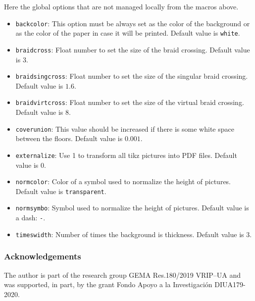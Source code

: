 \documentclass[reqno]{../../../Projects/LaTeX/gtpart}
\numberwithin{equation}{section}
\begin{document}
Here the global options that are not managed locally from the macros above. 
\begin{itemize}
\item {\tt backcolor}: This option must be always set as the color of the background or as the color of the paper in case it will be printed. Default value is {\tt white}.
\item {\tt braidcross}: Float number to set the size of the braid crossing. Default value is $3$.
\item {\tt braidsingcross}: Float number to set the size of the singular braid crossing. Default value is $1.6$.
\item {\tt braidvirtcross}: Float number to set the size of the virtual braid crossing. Default value is $8$.
\item {\tt coverunion}: This value should be increased if there is some white space between the floors. Default value is $0.001$.
\item {\tt externalize}: Use 1 to transform all tikz pictures into PDF files. Default value is $0$.
\item {\tt normcolor}: Color of a symbol used to normalize the height of pictures. Default value is {\tt transparent}.
\item {\tt normsymbo}: Symbol used to normalize the height of pictures. Default value is a dash: {\tt -}.
\item {\tt timeswidth}: Number of times the background is thickness. Default value is $3$.
\end{itemize}

\subsubsection*{Acknowledgements}
The author is part of the research group GEMA Res.180/2019 VRIP--UA and was supported, in part, by the grant Fondo Apoyo a la Investigaci\'on DIUA179-2020.



\end{document}
